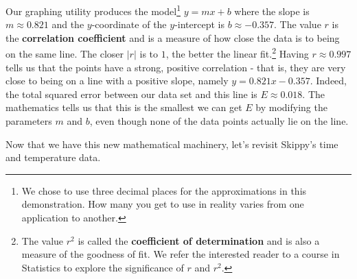 \documentclass{ximera}
\begin{document}
Our graphing utility produces the model\footnote{We chose to use three decimal places for the approximations in this demonstration.  How many you get to use in reality varies from one application to another.} $y=mx+b$ where the slope is $m \approx 0.821$ and the $y$-coordinate of the $y$-intercept is $b \approx -0.357$.  The value $r$ is the \textbf{correlation coefficient} and is a measure of how close the data is to being on the same line.  The closer $|r|$ is to $1$, the better the linear fit.\footnote{The value $r^2$ is called the \textbf{coefficient of determination} and is also a measure of the goodness of fit. We refer the interested reader to a course in Statistics to explore the significance of $r$ and $r^2$.} Having $r \approx 0.997$ tells us that the points have a strong, positive correlation - that is, they are very close to being on a line with a positive slope, namely $y = 0.821x - 0.357$.   Indeed, the total squared error between our data set and this line is $E \approx 0.018$. The mathematics tells us that this is the smallest we can get $E$ by modifying the parameters $m$ and $b$, even though none of the data points actually lie on the line.  



Now that we have this new mathematical machinery, let's revisit Skippy's time and temperature data.
  
\end{document}

